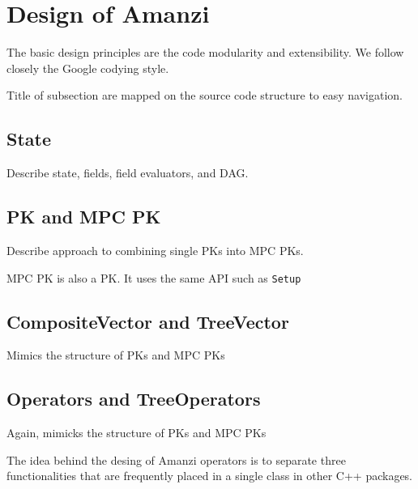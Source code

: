 %
%

\section{Design of Amanzi}

The basic design principles are the code modularity and extensibility.
We follow closely the Google codying style.

Title of subsection are mapped on the source code structure to easy navigation.


\subsection{State}

Describe state, fields, field evaluators, and DAG.


\subsection{PK and MPC PK}

Describe approach to combining single PKs into MPC PKs.

MPC PK is also a PK.
It uses the same API such as {\tt Setup}


\subsection{CompositeVector and TreeVector}

Mimics the structure of PKs and MPC PKs


\subsection{Operators and TreeOperators}

Again, mimicks the structure of PKs and MPC PKs

The idea behind the desing of Amanzi operators is to separate three 
functionalities that are frequently placed in a single class in other
C++ packages.

